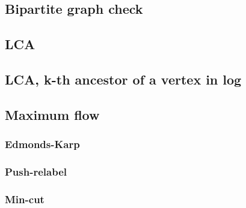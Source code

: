 \subsection{Bipartite graph check}


\subsection{LCA}


\subsection{LCA, k-th ancestor of a vertex in log}


\subsection{Maximum flow}

\subsubsection{Edmonds-Karp}


\subsubsection{Push-relabel}


\subsubsection{Min-cut}

